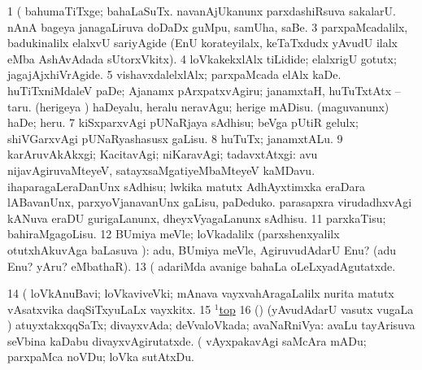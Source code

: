 \noindent
\gl{\pagu}
\expl{}
\bmng
\bnum
\num{1}  (  bahumaTiTxge; bahaLaSuTx. 
  
\banum
{} navanAjUkanunx parxdashiRsuva sakalarU. 
 nAnA bageya janagaLiruva doDaDx guMpu, samUha, saBe. 
\eanum
\numie
\num{3}  parxpaMcadalilx, badukinalilx elalxvU sariyAgide (EnU korateyilalx, keTaTxdudx yAvudU ilalx eMba AshAvAdada sUtorxVkitx). 
\num{4}  loVkakekxlAlx tiLidide; elalxrigU gotutx; jagajAjxhiVrAgide. 
\num{5}  vishavxdalelxlAlx; parxpaMcada elAlx kaDe. 
  
\banum
{} huTiTxniMdaleV paDe; Ajanamx pArxpatxvAgiru; janamxtaH, huTuTxtAtx -- taru. 
 (herigeya \vi) haDeyalu, heralu neravAgu; herige mADisu. 
 (maguvanunx) haDe; heru. 
\eanum
\numie
\num{7}  kiSxparxvAgi pUNaRjaya sAdhisu; beVga pUtiR gelulx; shiVGarxvAgi pUNaRyashasusx gaLisu. 
\num{8}  huTuTx; janamxtALu. 
\num{9}    karAruvAkAkxgi; KacitavAgi; niKaravAgi; tadavxtAtxgi:  avu nijavAgiruvaMteyeV, satayxsaMgatiyeMbaMteyeV kaMDavu. 
  
\banum
{} ihaparagaLeraDanUnx sAdhisu; lwkika matutx AdhAyxtimxka eraDara lABavanUnx, parxyoVjanavanUnx gaLisu, paDeduko. 
 parasapxra virudadhxvAgi kANuva eraDU gurigaLanunx, dheyxVyagaLanunx sAdhisu. 
\eanum
\numie
\num{11}  parxkaTisu; bahiraMgagoLisu. 
\num{12}  BUmiya meVle; loVkadalilx (parxshenxyalilx otutxhAkuvAga baLasuva \pagu):  adu, BUmiya meVle, AgiruvudAdarU Enu? (adu Enu? yAru? eMbathaR). 
\num{13}  (  adariMda avanige bahaLa oLeLxyadAgutatxde. 
\num{14}  (  loVkAnuBavi; loVkaviveVki; mAnava vayxvahAragaLalilx nurita matutx vAsatxvika daqSiTxyuLaLx vayxkitx. 
\num{15}  \hyperref{kandict_t.pdf}{T}{top(1) pagu(6)}{$^1$top}  
\num{16}  (\AmA) (yAvudAdarU vasutx \mo vugaLa \vi) atuyxtakxqqSaTx; divayxvAda; deVvaloVkada; avaNaRniVya:  avaLu tayArisuva seVbina kaDabu divayxvAgirutatxde. 
  (  
\banum
{} vAyxpakavAgi saMcAra mADu; parxpaMca noVDu; loVka sutAtxDu. 
